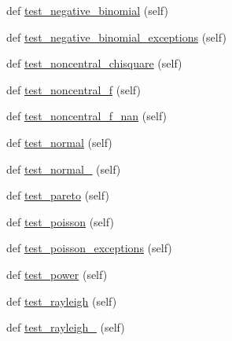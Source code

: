 \begin{DoxyCompactItemize}
\item 
def \hyperlink{classnumpy_1_1random_1_1tests_1_1test__randomstate_1_1TestRandomDist_a4e0d9517b4c143013290262346b06a42}{test\+\_\+negative\+\_\+binomial} (self)
\item 
def \hyperlink{classnumpy_1_1random_1_1tests_1_1test__randomstate_1_1TestRandomDist_ad7bff47df250f15c023c36dbbd2d1714}{test\+\_\+negative\+\_\+binomial\+\_\+exceptions} (self)
\item 
def \hyperlink{classnumpy_1_1random_1_1tests_1_1test__randomstate_1_1TestRandomDist_ac19ed271f16bffee929ce016b4aca2de}{test\+\_\+noncentral\+\_\+chisquare} (self)
\item 
def \hyperlink{classnumpy_1_1random_1_1tests_1_1test__randomstate_1_1TestRandomDist_a69e3bd6a784300fb19722391352846f8}{test\+\_\+noncentral\+\_\+f} (self)
\item 
def \hyperlink{classnumpy_1_1random_1_1tests_1_1test__randomstate_1_1TestRandomDist_aa50fb16f46ffd7ca8cb9ac694d60e7c8}{test\+\_\+noncentral\+\_\+f\+\_\+nan} (self)
\item 
def \hyperlink{classnumpy_1_1random_1_1tests_1_1test__randomstate_1_1TestRandomDist_ae442d89cd47fac92cddb0f8e9e1abdc6}{test\+\_\+normal} (self)
\item 
def \hyperlink{classnumpy_1_1random_1_1tests_1_1test__randomstate_1_1TestRandomDist_ae882a8aea8db3f961d228071c47642ea}{test\+\_\+normal\+\_} (self)
\item 
def \hyperlink{classnumpy_1_1random_1_1tests_1_1test__randomstate_1_1TestRandomDist_a38f4da3d142b5ab4be18874606951b2d}{test\+\_\+pareto} (self)
\item 
def \hyperlink{classnumpy_1_1random_1_1tests_1_1test__randomstate_1_1TestRandomDist_a9071c4bacbbb00c655906d90718707f8}{test\+\_\+poisson} (self)
\item 
def \hyperlink{classnumpy_1_1random_1_1tests_1_1test__randomstate_1_1TestRandomDist_a387362155d8c9693380336f90c8713c6}{test\+\_\+poisson\+\_\+exceptions} (self)
\item 
def \hyperlink{classnumpy_1_1random_1_1tests_1_1test__randomstate_1_1TestRandomDist_ab045725503a186160597b9805d474040}{test\+\_\+power} (self)
\item 
def \hyperlink{classnumpy_1_1random_1_1tests_1_1test__randomstate_1_1TestRandomDist_a4c9b04a36888dfd9f2fe0ce79da38e3a}{test\+\_\+rayleigh} (self)
\item 
def \hyperlink{classnumpy_1_1random_1_1tests_1_1test__randomstate_1_1TestRandomDist_ad9e9fd10f71ff793a590f973e4ea1c6b}{test\+\_\+rayleigh\+\_} (self)

\end{DoxyCompactItemize}
